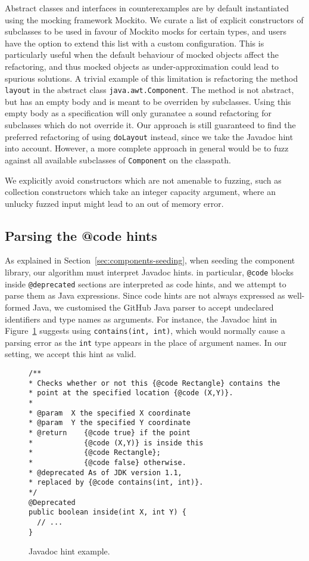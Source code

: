 \documentclass[sigconf,review,anonymous]{acmart}
\begin{document}
Abstract classes and interfaces in counterexamples are by default instantiated
using the mocking framework Mockito. We curate a list of explicit constructors
of subclasses to be used in favour of Mockito mocks for certain types, and users
have the option to extend this list with a custom configuration. This is
particularly useful when the default behaviour of mocked objects affect the
refactoring, and thus mocked objects as under-approximation could lead to
spurious solutions. A trivial example of this limitation is refactoring the
method \texttt{layout} in the abstract class \texttt{java.awt.Component}. The
method is not abstract, but has an empty body and is meant to be overriden by
subclasses. Using this empty body as a specification will only guranatee a sound
refactoring for subclasses which do not override it. Our approach is still
guaranteed to find the preferred refactoring of using \texttt{doLayout} instead,
since we take the Javadoc hint into account. However, a more complete approach
in general would be to fuzz against all available subclasses of
\texttt{Component} on the classpath.

We explicitly avoid constructors which are not amenable to fuzzing, such as
collection constructors which take an integer capacity argument, where an
unlucky fuzzed input might lead to an out of memory error.

\subsection{Parsing the @code hints}

As explained in Section~\ref{sec:components-seeding}, when seeding the component library, our algorithm must
interpret Javadoc hints. %
in particular, \texttt{@code} blocks inside \texttt{@deprecated} sections are interpreted as code
hints, and we attempt to parse them as Java expressions. Since code hints are
not always expressed as well-formed Java, we customised the
GitHub Java parser
to accept undeclared identifiers and type names
as arguments. For instance, the Javadoc hint in Figure~\ref{ex:javadoc-hint} suggests using
\texttt{contains(int, int)}, which would normally cause a parsing error as the \texttt{int} type
appears in the place of argument names. In our setting, we accept this hint as valid.


\begin{figure}
\begin{lstlisting}[mathescape=true,showstringspaces=false]
/**
* Checks whether or not this {@code Rectangle} contains the
* point at the specified location {@code (X,Y)}.
*
* @param  X the specified X coordinate
* @param  Y the specified Y coordinate
* @return    {@code true} if the point
*            {@code (X,Y)} is inside this
*            {@code Rectangle};
*            {@code false} otherwise.
* @deprecated As of JDK version 1.1,
* replaced by {@code contains(int, int)}.
*/
@Deprecated
public boolean inside(int X, int Y) {
  // ...
}
\end{lstlisting}
\caption{Javadoc hint example.}
\label{ex:javadoc-hint}
\end{figure}
\end{document}
